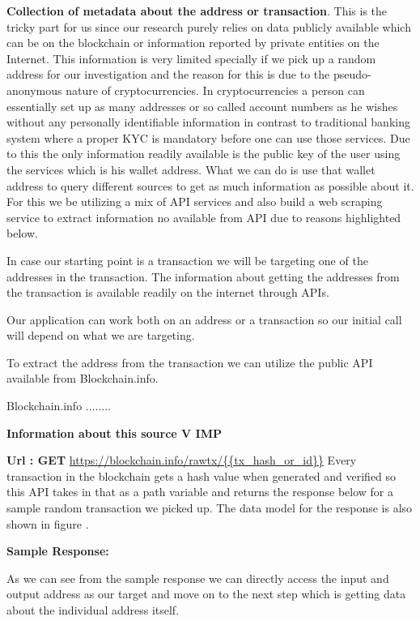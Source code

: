 \documentclass{article}
\begin{document}
        \textbf{Collection of metadata about the address or transaction}. 
        This is the tricky part for us since our research purely relies on data publicly available which can be on the blockchain or information reported by private entities on the Internet. This information is very limited specially if we pick up a random address for our investigation and the reason for this is due to the pseudo-anonymous nature of cryptocurrencies. In cryptocurrencies a person can essentially set up as many addresses or so called account numbers as he wishes without any personally identifiable information in contrast to traditional banking system where a proper KYC is mandatory before one can use those services. Due to this the only information readily available is the public key of the user using the services which is his wallet address. What we can do is use that wallet address to query different sources to get as much information as possible about it. For this we be utilizing a mix of API services and also build a web scraping service to extract information no available from API due to reasons highlighted below.
        
        In case our starting point is a transaction we will be targeting one of the addresses in the transaction. The information about getting the addresses from the transaction is available readily on the internet through APIs.
        
        Our application can work both on an address or a transaction so our initial call will depend on what we are targeting. 
        
        To extract the address from the transaction we can utilize the public API available from Blockchain.info\cite{blockchain.com}. 
        
        Blockchain.info ........
        
        \textbf{Information about this source V IMP}
        
        \textbf{Url : GET} \url{https://blockchain.info/rawtx/{{tx_hash_or_id}}}
        Every transaction in the blockchain gets a hash value when generated and verified so this API takes in that as a path variable and returns the response below for a sample random transaction we picked up. The data model for the response is also shown in figure \cite{Fig}.
        
        \textbf{Sample Response: }
        
        
        As we can see from the sample response we can directly access the input and output address as our target and move on to the next step which is getting data about the individual address itself.
        
\end{document}
